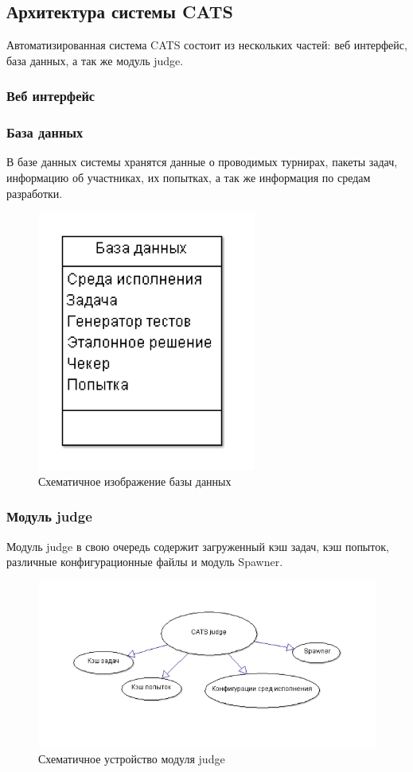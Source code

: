 \documentclass{imcs}
\begin{document}
\subsection{Архитектура системы CATS}
Автоматизированная система CATS состоит из нескольких частей: веб интерфейс, база данных, а так же модуль judge. 


\subsubsection{Веб интерфейс}

\subsubsection{База данных}
В базе данных системы хранятся данные о проводимых турнирах, пакеты задач, информацию об участниках, их попытках, а так же информация по средам разработки.


\begin{figure}[htb]
\centering
\includegraphics{./img/db.png}
\caption{Схематичное изображение базы данных}
\label{dbfields}
\end{figure}

\subsubsection{Модуль judge}
Модуль judge в свою очередь содержит загруженный кэш задач, кэш попыток, различные конфигурационные файлы и модуль Spawner.

\begin{figure}[htb]
\centering
\includegraphics{./img/judge.png}
\caption{Схематичное устройство модуля judge}
\label{judgemodule}
\end{figure}
\end{document}
